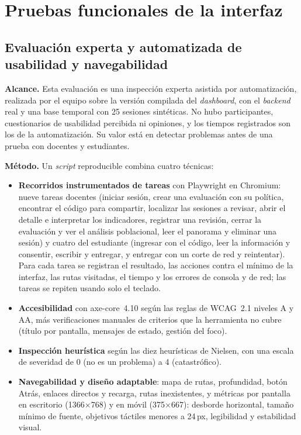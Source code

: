 \section{Pruebas funcionales de la interfaz}
\label{sec:eval_interfaz}

\subsection{Evaluación experta y automatizada de usabilidad y navegabilidad}
\label{sec:eval_usabilidad}

\textbf{Alcance.} Esta evaluación es una inspección experta asistida por automatización, realizada por el equipo sobre la versión compilada del \textit{dashboard}, con el \textit{backend} real y una base temporal con 25 sesiones sintéticas. No hubo participantes, cuestionarios de usabilidad percibida ni opiniones, y los tiempos registrados son los de la automatización. Su valor está en detectar problemas antes de una prueba con docentes y estudiantes.

\textbf{Método.} Un \textit{script} reproducible combina cuatro técnicas:

\begin{itemize}
    \item \textbf{Recorridos instrumentados de tareas} con Playwright en Chromium: nueve tareas docentes (iniciar sesión, crear una evaluación con su política, encontrar el código para compartir, localizar las sesiones a revisar, abrir el detalle e interpretar los indicadores, registrar una revisión, cerrar la evaluación y ver el análisis poblacional, leer el panorama y eliminar una sesión) y cuatro del estudiante (ingresar con el código, leer la información y consentir, escribir y entregar, y entregar con un corte de red y reintentar). Para cada tarea se registran el resultado, las acciones contra el mínimo de la interfaz, las rutas visitadas, el tiempo y los errores de consola y de red; las tareas se repiten usando solo el teclado.
    \item \textbf{Accesibilidad} con axe-core~4.10 según las reglas de WCAG~2.1 niveles A y AA, más verificaciones manuales de criterios que la herramienta no cubre (título por pantalla, mensajes de estado, gestión del foco).
    \item \textbf{Inspección heurística} según las diez heurísticas de Nielsen, con una escala de severidad de 0 (no es un problema) a 4 (catastrófico).
    \item \textbf{Navegabilidad y diseño adaptable}: mapa de rutas, profundidad, botón Atrás, enlaces directos y recarga, rutas inexistentes, y métricas por pantalla en escritorio (1366$\times$768) y en móvil (375$\times$667): desborde horizontal, tamaño mínimo de fuente, objetivos táctiles menores a 24\,px, legibilidad y estabilidad visual.
\end{itemize}

